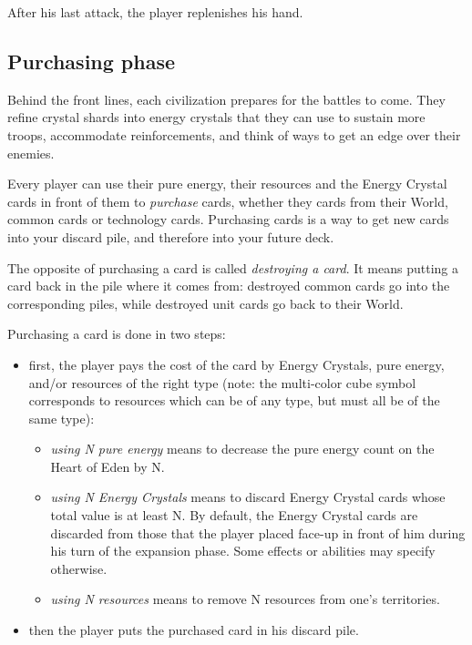 \documentclass[a4paper]{article}
\begin{document}
        After his last attack, the player replenishes his hand.
        
    
    \subsection{Purchasing phase}
        \label{purchase}
        Behind the front lines, each civilization prepares for the battles to come.
        They refine crystal shards into energy crystals that they can use to
        sustain more troops, accommodate reinforcements,
        and think of ways to get an edge over their enemies.
        
        Every player can use their pure energy, their resources
        and the Energy Crystal cards in front of them to \textit{purchase} cards,
        whether they cards from their World, common cards or technology cards.
        Purchasing cards is a way to get new cards into your discard pile,
        and therefore into your future deck.
        
        The opposite of  purchasing a card is called \textit{destroying a card}.
        It means putting a card back in the pile where it comes from:
        destroyed common cards go into the corresponding piles,
        while destroyed unit cards go back to their World.

        Purchasing a card is done in two steps:
        \vspace{-1.3em}
        \begin{itemize}
            \item first, the player pays the cost of the card by Energy Crystals, 
                 pure energy, and/or resources of the right type
                (note: the multi-color cube symbol corresponds to resources
                which can be of any type, but must all be of the same type):
                \vspace{-0.5em}
                \begin{itemize}
                    \item \textit{using N pure energy} means to decrease the
                    pure energy count on the Heart of Eden by N.
                    \item \textit{using N Energy Crystals} means to discard Energy Crystal
                        cards whose total value is at least N.
                        By default, the Energy Crystal cards are discarded from those
                        that the player placed face-up in front of him during his
                        turn of the expansion phase.
                        Some effects or abilities may specify otherwise.
                    \item \textit{using N resources} means to remove N resources
                        from one's territories.
                \end{itemize}
            \item then the player puts the purchased card in his discard pile.
        \end{itemize}
        
\end{document}
